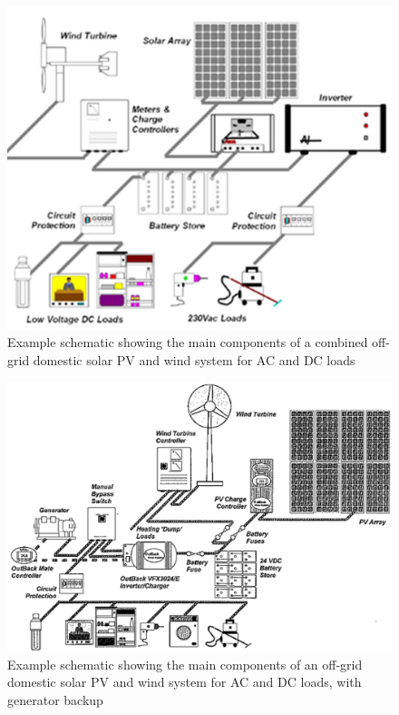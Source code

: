 \documentclass[article]{standalone}
\begin{document}
\begin{figure}
\centering
\includegraphics[width=0.9\linewidth]{../figures/large-off-grid-solarwind-ACDC.jpg}
\caption{Example schematic showing the main components of a combined off-grid domestic solar PV and wind system for AC and DC loads}
\label{fig:solarwindACDC}
\end{figure}


\begin{figure}
\centering
\includegraphics[width=0.9\linewidth]{../figures/large-off-grid-solarwind-gen-ACDC.jpg}
\caption{Example schematic showing the main components of an off-grid domestic solar PV and wind system for AC and DC loads, with generator backup}
\label{fig:solarwindACDCgen}
\end{figure}
\end{document}
